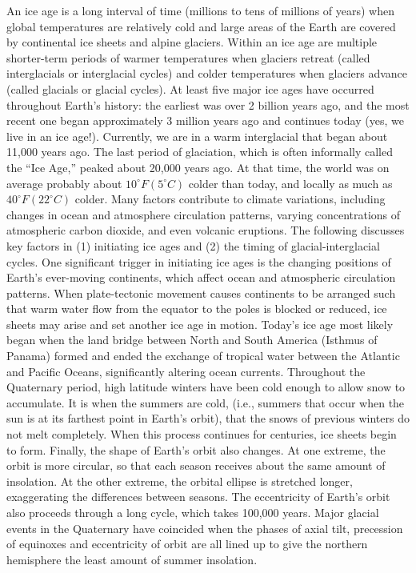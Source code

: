 		\ddd An ice age is a long interval of time (millions to tens of millions of years) when global temperatures are relatively cold and large areas of the Earth are covered by continental ice sheets and alpine glaciers. Within an ice age are multiple shorter-term periods of warmer temperatures when glaciers retreat (called interglacials or interglacial cycles) and colder temperatures when glaciers advance (called glacials or glacial cycles).
		\ddd At least five major ice ages have occurred throughout Earth’s history: the earliest was over 2 billion years ago, and the most recent one began approximately 3 million years ago and continues today (yes, we live in an ice age!).
		\ddd Currently, we are in a warm interglacial that began about 11,000 years ago. The last period of glaciation, which is often informally called the “Ice Age,” peaked about 20,000 years ago. At that time, the world was on average probably about $ 10^\circ F (5^\circ C) $ colder than today, and locally as much as $ 40^\circ F (22^\circ C) $ colder.
		\ddd Many factors contribute to climate variations, including changes in ocean and atmosphere circulation patterns, varying concentrations of atmospheric carbon dioxide, and even volcanic eruptions. The following discusses key factors in (1) initiating ice ages and (2) the timing of glacial-interglacial cycles.
		\ddd One significant trigger in initiating ice ages is the changing positions of Earth’s ever-moving continents, which affect ocean and atmospheric circulation patterns. When plate-tectonic movement causes continents to be arranged such that warm water flow from the equator to the poles is blocked or reduced, ice sheets may arise and set another ice age in motion.
		\ddd Today’s ice age most likely began when the land bridge between North and South America (Isthmus of Panama) formed and ended the exchange of tropical water between the Atlantic and Pacific Oceans, significantly altering ocean currents.
		\ddd Throughout the Quaternary period, high latitude winters have been cold enough to allow snow to accumulate. It is when the summers are cold, (i.e., summers that occur when the sun is at its farthest point in Earth's orbit), that the snows of previous winters do not melt completely. When this process continues for centuries, ice sheets begin to form. Finally, the shape of Earth's orbit also changes. At one extreme, the orbit is more circular, so that each season receives about the same amount of insolation. At the other extreme, the orbital ellipse is stretched longer, exaggerating the differences between seasons. The eccentricity of Earth's orbit also proceeds through a long cycle, which takes 100,000 years. Major glacial events in the Quaternary have coincided when the phases of axial tilt, precession of equinoxes and eccentricity of orbit are all lined up to give the northern hemisphere the least amount of summer insolation.
